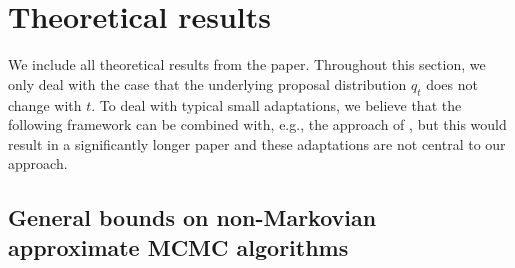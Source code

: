 \section{Theoretical results} \label{app:theory}

We include all theoretical results from the paper. Throughout this section, we only deal with the case that the underlying proposal distribution $q_{t}$ does not change with $t$. To deal with typical small adaptations, we believe that the following framework can be combined with, e.g., the approach of \citet{roberts2007coupling}, but this would result in a significantly longer paper and these adaptations are not central to our approach.

\subsection{General bounds on non-Markovian approximate MCMC algorithms}

